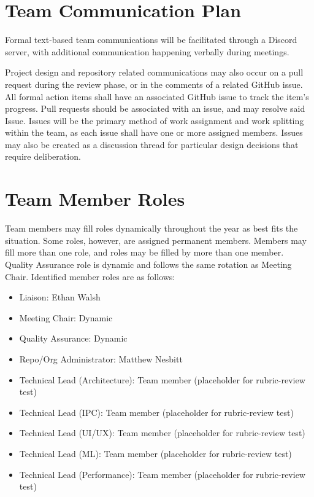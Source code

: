 \documentclass{article}
\begin{document}
\section{Team Communication Plan}

Formal text-based team communications will be facilitated through a Discord server, with additional
communication happening verbally during meetings.

\vspace{5mm}

Project design and repository related communications may also occur on a pull request during the
review phase, or in the comments of a related GitHub issue. All formal action items shall have an
associated GitHub issue to track the item's progress. Pull requests should be associated with an
issue, and may resolve said Issue. Issues will be the primary method of work assignment and work
splitting within the team, as each issue shall have one or more assigned members. Issues may also be
created as a discussion thread for particular design decisions that require deliberation.

\section{Team Member Roles}

Team members may fill roles dynamically throughout the year as best fits the situation. Some roles,
however, are assigned permanent members. Members may fill more than one role, and roles may be
filled by more than one member. Quality Assurance role is dynamic and follows the same rotation as Meeting Chair.
Identified member roles are as follows:
\begin{itemize}
	\item Liaison: Ethan Walsh
	\item Meeting Chair: Dynamic
	\item Quality Assurance: Dynamic
	\item Repo/Org Administrator: Matthew Nesbitt
	\item Technical Lead (Architecture): Team member (placeholder for rubric-review test)
	\item Technical Lead (IPC): Team member (placeholder for rubric-review test)
	\item Technical Lead (UI/UX): Team member (placeholder for rubric-review test)
	\item Technical Lead (ML): Team member (placeholder for rubric-review test)
	\item Technical Lead (Performance): Team member (placeholder for rubric-review test)
\end{itemize}
\end{document}
